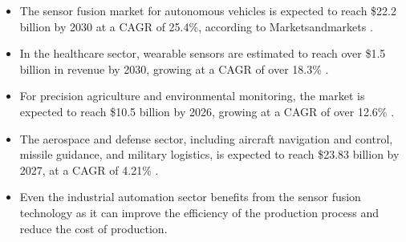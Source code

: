 \documentclass[rnd]{mas_proposal}
\begin{document}
\begin{itemize}
    \item The sensor fusion market for autonomous vehicles is expected to reach \$22.2 billion by 2030 at a CAGR of 25.4\%, according to Marketsandmarkets \cite{marketsandmarkets}.
    
    \item In the healthcare sector, wearable sensors are estimated to reach over \$1.5 billion in revenue by 2030, growing at a CAGR of over 18.3\% \cite{straitsresearch2021}.
    
    \item For precision agriculture and environmental monitoring, the market is expected to reach \$10.5 billion by 2026, growing at a CAGR of over 12.6\% \cite{mordorintelligence2023}.
    
    \item The aerospace and defense sector, including aircraft navigation and control, missile guidance, and military logistics, is expected to reach \$23.83 billion by 2027, at a CAGR of 4.21\% \cite{fortunebusinessinsights2023}.
    
    \item Even the industrial automation sector benefits from the sensor fusion technology as it can improve the efficiency of the production process and reduce the cost of production.




    




\end{itemize}
\end{document}
